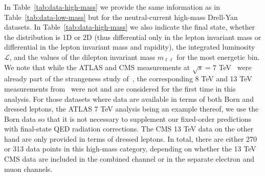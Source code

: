 \documentclass[withindex,glossary]{cam-thesis}
\begin{document}
In Table~\ref{tab:data-high-mass} we provide the same
information as in Table~\ref{tab:data-low-mass} but for the neutral-current high-mass Drell-Yan datasets.
%
In Table~\ref{tab:data-high-mass} we also indicate the final state,
whether the distribution is 1D or 2D (thus differential only in the
lepton invariant mass or differential in the lepton invariant mass and
rapidity), the integrated luminosity $\mathcal{L}$,
and the values of the dilepton invariant mass $m_{\ell\ell}$ for the most energetic bin.
  We note that while the ATLAS and CMS measurements at $\sqrt{s}=7$ TeV~\cite{Aad:2013iua,Chatrchyan:2013tia}
  were already part of the  strangeness study of~\cite{Faura:2020oom},
  the corresponding 8 TeV and 13 TeV measurements from~\cite{Aad:2016zzw,CMS:2014jea,Sirunyan:2018owv}
were not and are considered for the first time in this analysis.
%
For those datasets where data are available in terms of both Born
and dressed leptons, the ATLAS 7 TeV analysis being an example thereof, we use
the Born data so that it is not necessary to supplement our fixed-order predictions with
final-state QED radiation corrections. The CMS 13 TeV data on the
other hand are only provided in terms of dressed leptons. 
%
In total, there are either 270 or 313 data points in this high-mass category, depending on whether the
13 TeV CMS data are included in the combined channel or in the separate electron and muon channels.


\end{document}
